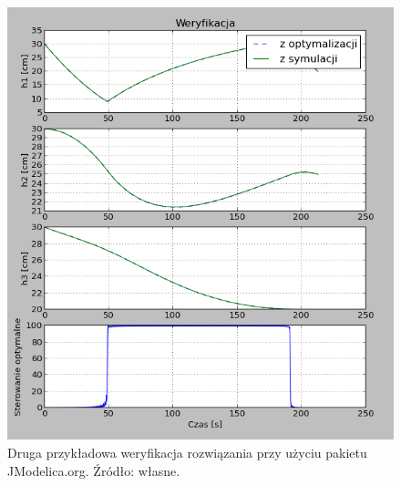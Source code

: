 \begin{figure}[htp]
    \centering
    \includegraphics{Grafika/plot_30_30_30-20_25_20_raw_200}
    \caption{Druga przykładowa weryfikacja rozwiązania przy użyciu pakietu JModelica.org. Źródło: własne.}
    \label{fig:plot303030-202520raw200}
\end{figure}

